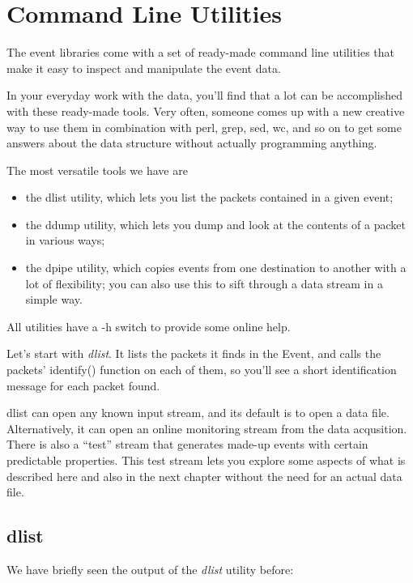 \documentclass{article}[11pt]
\begin{document}
\section{Command Line Utilities}
\label{tools}

The event libraries come with a set of ready-made command line
utilities that make it easy to inspect and manipulate the event
data.

In your everyday work with the data, you'll find that a lot can be
accomplished with these ready-made tools. Very often, someone comes up
with a new creative way to use them in combination with perl, grep, sed,
wc, and so on to get some answers about the data structure without
actually programming anything.

The most versatile tools we have are
\begin{itemize}
\item  the dlist utility, which lets you list the packets contained in a given event;

\item the ddump utility, which lets you dump and look at the contents of a packet in various ways;

\item the dpipe utility, which copies events from one destination to
  another with a lot of flexibility; you can also use this to sift
  through a data stream in a simple way.
\end{itemize}

All utilities have a -h switch to provide some online help.

Let's start with \emph{dlist}. It lists the packets it finds in the
Event, and calls the packets' identify() function on each of them, so
you'll see a short identification message for each packet found.

dlist can open any known input stream, and its default is to open a
data file. Alternatively, it can open an online monitoring stream from
the data acqusition. There is also a ``test'' stream that generates
made-up events with certain predictable properties. This test stream
lets you explore some aspects of what is described here and also in
the next chapter without the need for an actual data file.

\subsection{dlist}

We have briefly seen the output of the  \emph{dlist} utility 
before:
\end{document}
